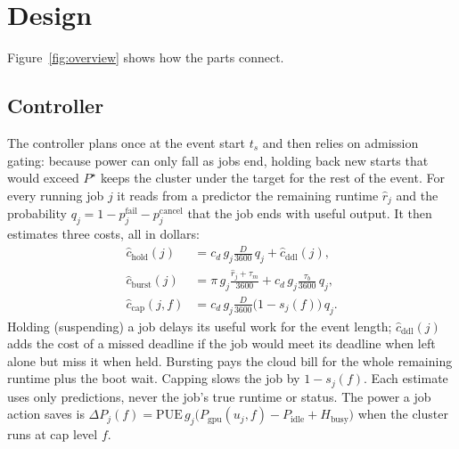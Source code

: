 \section{Design}
\label{sec:design}
Figure~\ref{fig:overview} shows how the parts connect.



\subsection{Controller}
The controller plans once at the event start $t_s$ and then relies on admission gating: because power can only fall as jobs end, holding back new starts that would exceed $P^\star$ keeps the cluster under the target for the rest of the event.
For every running job $j$ it reads from a predictor the remaining runtime $\hat r_j$ and the probability $q_j=1-p^{\text{fail}}_j-p^{\text{cancel}}_j$ that the job ends with useful output. It then estimates three costs, all in dollars:
\begin{align}
\hat c_{\text{hold}}(j)&=c_d\,g_j\tfrac{D}{3600}\,q_j+\hat c_{\text{ddl}}(j),\label{eq:hold}\\
\hat c_{\text{burst}}(j)&=\pi\,g_j\tfrac{\hat r_j+\tau_m}{3600}+c_d\,g_j\tfrac{\tau_b}{3600}\,q_j,\\
\hat c_{\text{cap}}(j,f)&=c_d\,g_j\tfrac{D}{3600}\bigl(1-s_j(f)\bigr)\,q_j .
\end{align}
Holding (suspending) a job delays its useful work for the event length; $\hat c_{\text{ddl}}(j)$ adds the cost of a missed deadline if the job would meet its deadline when left alone but miss it when held. Bursting pays the cloud bill for the whole remaining runtime plus the boot wait. Capping slows the job by $1-s_j(f)$. Each estimate uses only predictions, never the job's true runtime or status.
The power a job action saves is $\Delta P_j(f)=\text{PUE}\,g_j\bigl(P_{\text{gpu}}(u_j,f)-P_{\text{idle}}+H_{\text{busy}}\bigr)$ when the cluster runs at cap level $f$.

